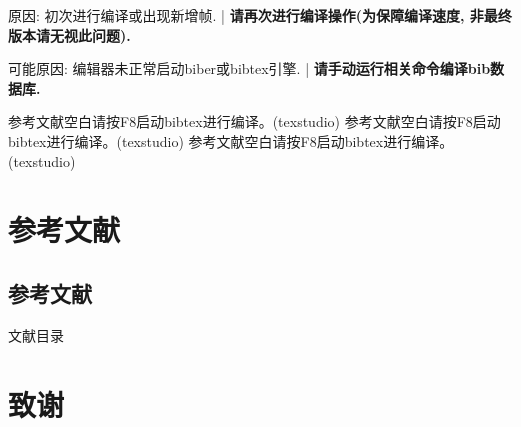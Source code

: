 \documentclass[hyperref, UTF8, CJK, aspectratio=169]{beamer}
\begin{document}
\begin{frame}[allowframebreaks]
  \par
  原因: 初次进行编译或出现新增帧. | \textbf{请再次进行编译操作(为保障编译速度, 非最终版本请无视此问题).}\par\vspace{2ex}
  \par
  可能原因: 编辑器未正常启动biber或bibtex引擎. | \textbf{请手动运行相关命令编译bib数据库.}\par\vspace{2ex}
	参考文献空白请按F8启动bibtex进行编译。(texstudio)
	参考文献空白请按F8启动bibtex进行编译。(texstudio)
	参考文献空白请按F8启动bibtex进行编译。(texstudio)
\end{frame}

\section{参考文献}
\subsection{参考文献}
\begin{frame}[allowframebreaks]{文献目录}
	\nocite{*}

	\printbibliography[heading=none]
\end{frame}

\section{致谢}
\end{document}
